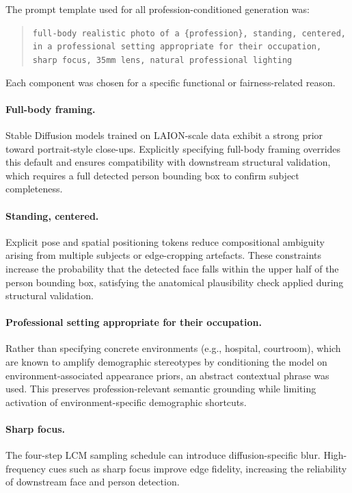 The prompt template used for all profession-conditioned generation was:

\begin{quote}
	\texttt{full-body realistic photo of a \{profession\}, standing, centered, in a professional setting appropriate for their occupation, sharp focus, 35mm lens, natural professional lighting}
\end{quote}

Each component was chosen for a specific functional or fairness-related reason.

\paragraph{Full-body framing.}
Stable Diffusion models trained on LAION-scale data exhibit a strong prior toward portrait-style close-ups. Explicitly specifying full-body framing overrides this default and ensures compatibility with downstream structural validation, which requires a full detected person bounding box to confirm subject completeness.

\paragraph{Standing, centered.}
Explicit pose and spatial positioning tokens reduce compositional ambiguity arising from multiple subjects or edge-cropping artefacts. These constraints increase the probability that the detected face falls within the upper half of the person bounding box, satisfying the anatomical plausibility check applied during structural validation.

\paragraph{Professional setting appropriate for their occupation.}
Rather than specifying concrete environments (e.g., hospital, courtroom), which are known to amplify demographic stereotypes by conditioning the model on environment-associated appearance priors, an abstract contextual phrase was used. This preserves profession-relevant semantic grounding while limiting activation of environment-specific demographic shortcuts.

\paragraph{Sharp focus.}
The four-step LCM sampling schedule can introduce diffusion-specific blur. High-frequency cues such as sharp focus improve edge fidelity, increasing the reliability of downstream face and person detection.

